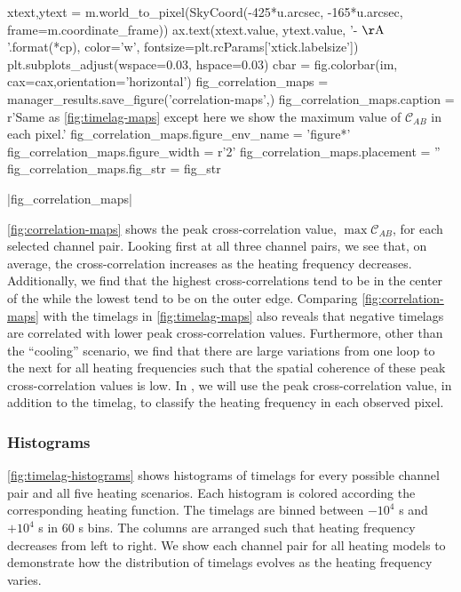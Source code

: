 \begin{pycode}
            xtext,ytext = m.world_to_pixel(SkyCoord(-425*u.arcsec, -165*u.arcsec, frame=m.coordinate_frame))
            ax.text(xtext.value, ytext.value, '{}-{} $\mathrm{{\AA}}$'.format(*cp),
                    color='w', fontsize=plt.rcParams['xtick.labelsize'])
plt.subplots_adjust(wspace=0.03, hspace=0.03)
cbar = fig.colorbar(im, cax=cax,orientation='horizontal')
fig_correlation_maps = manager_results.save_figure('correlation-maps',)
fig_correlation_maps.caption = r'Same as \autoref{fig:timelag-maps} except here we show the maximum value of $\mathcal{C}_{AB}$ in each pixel.'
fig_correlation_maps.figure_env_name = 'figure*'
fig_correlation_maps.figure_width = r'2\columnwidth'
fig_correlation_maps.placement = ''
fig_correlation_maps.fig_str = fig_str
\end{pycode}
|fig_correlation_maps|

\autoref{fig:correlation-maps} shows the peak cross-correlation value, $\max\mathcal{C}_{AB}$, for each selected channel pair. Looking first at all three channel pairs, we see that, on average, the cross-correlation increases as the heating frequency decreases. Additionally, we find that the highest cross-correlations tend to be in the center of the \AR{} while the lowest tend to be on the outer edge. Comparing \autoref{fig:correlation-maps} with the timelags in \autoref{fig:timelag-maps} also reveals that negative timelags are correlated with lower peak cross-correlation values. Furthermore, other than the ``cooling'' scenario, we find that there are large variations from one loop to the next for all heating frequencies such that the spatial coherence of these peak cross-correlation values is low. In , we will use the peak cross-correlation value, in addition to the timelag, to classify the heating frequency in each observed pixel.

\subsubsection{Histograms}\label{timelag_histograms}

\autoref{fig:timelag-histograms} shows histograms of timelags for every possible channel pair and all five heating scenarios. Each histogram is colored according the corresponding heating function. The timelags are binned between $-10^4$ s and $+10^4$ s in 60 s bins. The columns are arranged such that heating frequency decreases from left to right. We show each channel pair for all heating models to demonstrate how the distribution of timelags evolves as the heating frequency varies.

